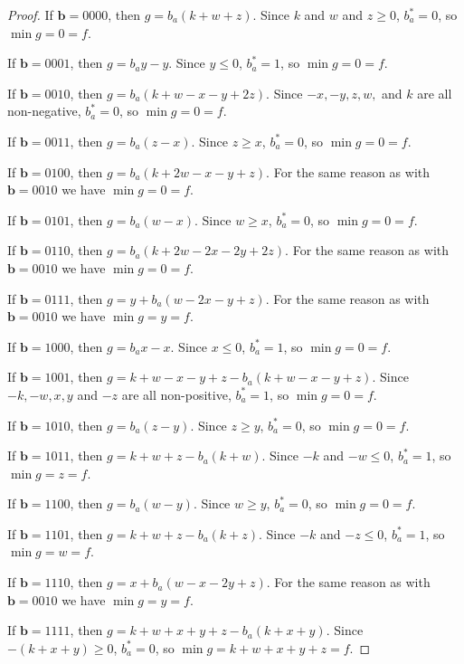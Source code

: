 \documentclass[11pt]{scrartcl}
\newcommand{\vc}[1]{\boldsymbol{#1}}
\begin{document}
\begin{proof}
If $\vc b = 0000$, then $g = b_a(k + w + z)$.
Since $k$ and $ w $ and $z \ge 0$, $b_a^* = 0$, so $\min g = 0 = f$.

If $\vc b = 0001$, then $g = b_ay - y$.
Since $y \le 0$, $b_a^* = 1$, so $\min g = 0 = f$.

If $\vc b = 0010$, then $g = b_a(k + w - x - y + 2z)$.
Since $-x, -y, z, w,$ and $k$ are all non-negative, $b_a^* = 0$, so $\min g = 0 = f$.

If $\vc b = 0011$, then $g = b_a(z - x)$.
Since $z \ge x$, $b_a^* = 0$, so $\min g = 0 = f$.

If $\vc b = 0100$, then $g = b_a(k + 2w - x - y + z)$.
For the same reason as with $\vc b = 0010$ we have $\min g = 0 = f$.

If $\vc b = 0101$, then $g = b_a(w - x)$.
Since $w \ge x$, $b_a^* = 0$, so $\min g = 0 = f$.

If $\vc b = 0110$, then $g = b_a(k + 2w - 2x - 2y + 2z)$.
For the same reason as with $\vc b = 0010$ we have $\min g = 0 = f$.

If $\vc b = 0111$, then $g = y + b_a(w - 2x - y + z)$.
For the same reason as with $\vc b = 0010$ we have $\min g = y = f$.


If $\vc b = 1000$, then $g = b_ax - x$.
Since $x \le 0$, $b_a^* = 1$, so $\min g = 0 = f$.

If $\vc b = 1001$, then $g = k + w - x - y + z - b_a(k + w - x - y + z)$.
Since $-k, -w, x, y $ and $-z$ are all non-positive, $b_a^* = 1$, so $\min g = 0 = f$.

If $\vc b = 1010$, then $g = b_a(z - y)$.
Since $z \ge y$, $b_a^* = 0$, so $\min g = 0 = f$.

If $\vc b = 1011$, then $g = k + w + z - b_a(k + w)$.
Since $-k$ and $-w \le 0$, $b_a^* = 1$, so $\min g = z = f$.

If $\vc b = 1100$, then $g = b_a(w - y)$.
Since $w \ge y$, $b_a^* = 0$, so $\min g = 0 = f$.

If $\vc b = 1101$, then $g = k + w + z - b_a(k + z)$.
Since $-k$ and $-z \le 0$, $b_a^* = 1$, so $\min g = w = f$.

If $\vc b = 1110$, then $g = x + b_a(w - x - 2y + z)$.
For the same reason as with $\vc b = 0010$ we have $\min g = y = f$.

If $\vc b = 1111$, then $g = k + w + x + y + z - b_a(k + x + y)$.
Since $-(k+x+y) \ge 0$, $b_a^* = 0$, so $\min g = k + w + x + y + z = f$.
\end{proof}
\end{document}
